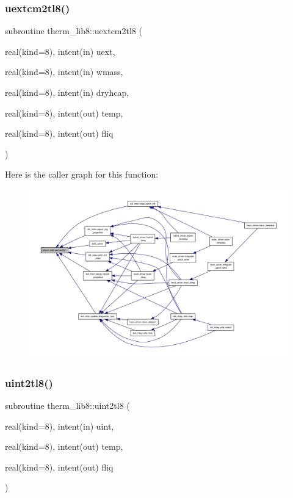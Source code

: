 \mbox{\label{namespacetherm__lib8_af00b031b94385eb06e81a837246715bd}} 
\subsubsection{\texorpdfstring{uextcm2tl8()}{uextcm2tl8()}}
{\footnotesize\ttfamily subroutine therm\+\_\+lib8\+::uextcm2tl8 (\begin{DoxyParamCaption}\item[{real(kind=8), intent(in)}]{uext,  }\item[{real(kind=8), intent(in)}]{wmass,  }\item[{real(kind=8), intent(in)}]{dryhcap,  }\item[{real(kind=8), intent(out)}]{temp,  }\item[{real(kind=8), intent(out)}]{fliq }\end{DoxyParamCaption})}

Here is the caller graph for this function\+:
\nopagebreak
\begin{figure}[H]
\begin{center}
\leavevmode
\includegraphics[width=350pt]{namespacetherm__lib8_af00b031b94385eb06e81a837246715bd_icgraph}
\end{center}
\end{figure}
\mbox{\label{namespacetherm__lib8_a25d3d7f68a7ddbdf3c13eac03b1bb780}} 
\subsubsection{\texorpdfstring{uint2tl8()}{uint2tl8()}}
{\footnotesize\ttfamily subroutine therm\+\_\+lib8\+::uint2tl8 (\begin{DoxyParamCaption}\item[{real(kind=8), intent(in)}]{uint,  }\item[{real(kind=8), intent(out)}]{temp,  }\item[{real(kind=8), intent(out)}]{fliq }\end{DoxyParamCaption})}


